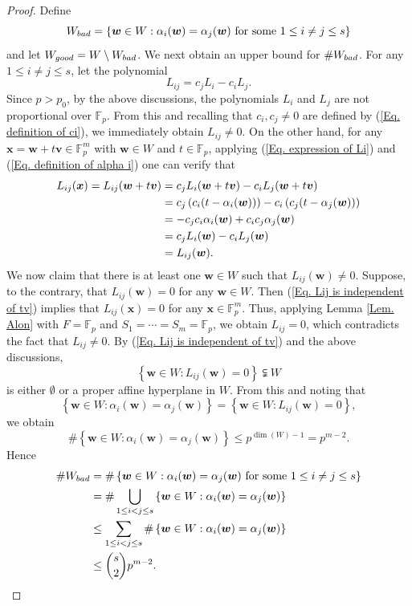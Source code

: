 \documentclass[10pt,a4paper]{amsart}
\def\v{{\bm v}}
\def\w{{\bm w}}
\def\x{{\bm x}}
\def\bad{{\rm bad}}
\def\good{{\rm good}}
\begin{document}
\begin{proof}
Define 
$$W_{\bad}=\left\{\w\in W: \alpha_i(\w)=\alpha_j(\w)\ \text{for some $1\le i\neq j\le s$}\right\}$$
and let $W_{\good}=W\setminus W_{\bad}$. We next obtain an upper bound for $\# W_{\bad}$. For any $1\le i\neq j\le s$, let the polynomial
$$L_{ij}=c_jL_i-c_iL_j.$$
Since $p>p_0$, by the above discussions, the polynomials $L_i$ and $L_j$ are not proportional over $\mathbb{F}_p$. From this and recalling that  $c_i,c_j\neq 0$ are defined by (\ref{Eq. definition of ci}), we immediately obtain $L_{ij}\neq 0$. On the other hand, for any $\x=\w+t\v\in\mathbb{F}_p^m$ with $\w\in W$ and $t\in\mathbb{F}_p$, applying (\ref{Eq. expression of Li}) and (\ref{Eq. definition of alpha i}) one can verify that 
\begin{align}\label{Eq. Lij is independent of tv}
	L_{ij}(\x)=L_{ij}(\w+t\v)
&=c_jL_i(\w+t\v)-c_iL_j(\w+t\v)\notag\\
&=c_j\left(c_i(t-\alpha_i(\w))\right)-c_i\left(c_j(t-\alpha_j(\w))\right)\notag\\
&=-c_jc_i\alpha_i(\w)+c_ic_j\alpha_j(\w)\notag\\
&=c_jL_i(\w)-c_iL_j(\w)\notag\\
&=L_{ij}(\w).
\end{align}
We now claim that there is at least one $\w\in W$ such that $L_{ij}(\w)\neq 0$. Suppose, to the contrary, that $L_{ij}(\w)=0$ for any $\w\in W$. Then (\ref{Eq. Lij is independent of tv}) implies that $L_{ij}(\x)=0$ for any $\x\in\mathbb{F}_p^m$. Thus, applying Lemma \ref{Lem. Alon} with $F=\mathbb{F}_p$ and $S_1=\cdots=S_m=\mathbb{F}_p$, we obtain $L_{ij}=0$, which contradicts the fact that $L_{ij}\neq 0$. By (\ref{Eq. Lij is independent of tv}) and the above discussions, 
$$\left\{\w\in W: L_{ij}(\w)=0\right\}\subsetneqq W$$
is either $\emptyset$ or a proper affine hyperplane in $W$. From this and noting that 
$$\left\{\w\in W: \alpha_i(\w)=\alpha_j(\w)\right\}=\left\{\w\in W: L_{ij}(\w)=0\right\},$$
we obtain 
$$\#\left\{\w\in W: \alpha_i(\w)=\alpha_j(\w)\right\}\le p^{\dim(W)-1}=p^{m-2}.$$
Hence 
\begin{align}\label{Eq. upper bound for W bad}
	\#W_{\bad}
&=\#\left\{\w\in W: \alpha_i(\w)=\alpha_j(\w)\ \text{for some $1\le i\neq j\le s$}\right\}\notag\\
&=\#\bigcup_{1\le i<j\le s}\left\{\w\in W: \alpha_i(\w)=\alpha_j(\w)\right\}\notag\\
&\le \sum_{1\le i<j\le s}\#\left\{\w\in W: \alpha_i(\w)=\alpha_j(\w)\right\}\notag\\
&\le \binom{s}{2}p^{m-2}.
\end{align}


\end{proof}
\end{document}
